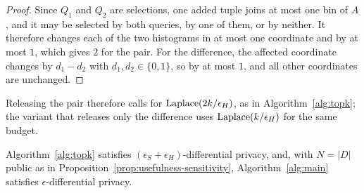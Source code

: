\begin{proof}
Since $Q_1$ and $Q_2$ are selections, one added tuple joins at most one bin of $A$, and it may be selected by both queries, by one of them, or by neither.
It therefore changes each of the two histograms in at most one coordinate and by at most $1$, which gives $2$ for the pair.
For the difference, the affected coordinate changes by $d_1-d_2$ with $d_1,d_2\in\{0,1\}$, so by at most $1$, and all other coordinates are unchanged.
\end{proof}

Releasing the pair therefore calls for $\operatorname{Laplace}(2k/\epsilon_H)$, as in Algorithm~\ref{alg:topk}; the variant that releases only the difference uses $\operatorname{Laplace}(k/\epsilon_H)$ for the same budget.

\begin{proposition}
\label{thm:alg1-dp}
Algorithm~\ref{alg:topk} satisfies $(\epsilon_S+\epsilon_H)$-differential privacy, and, with $N=|D|$ public as in Proposition~\ref{prop:usefulness-sensitivity}, Algorithm~\ref{alg:main} satisfies $\epsilon$-differential privacy.
\end{proposition}

